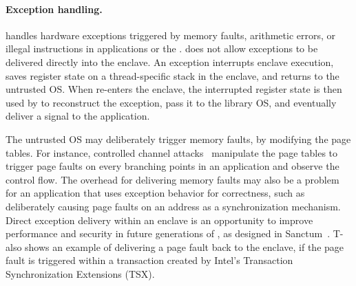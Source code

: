 \paragraph{Exception handling.}
\graphenesgx{} handles hardware exceptions triggered by memory faults, arithmetic errors, or illegal instructions in applications or the \libos{}.
\sgx{} does not allow exceptions to be delivered directly into the enclave.
An exception interrupts enclave execution, 
saves register state on a thread-specific stack in the enclave,
and returns to the untrusted OS.
When \sgx{} re-enters the enclave, the interrupted register state
is then used by
\graphenesgx{} to reconstruct the exception, pass it to the library OS, and eventually deliver a signal to the application.



The untrusted OS may deliberately trigger memory faults, %
by modifying the page tables.
For instance, controlled channel attacks~\cite{xu15controlledchannel}
manipulate the page tables to trigger page faults on every branching points in an \sgx{} application
and observe the control flow.
The overhead for delivering memory faults
may also be a problem
for an application that uses exception behavior for correctness, such as deliberately causing page faults on an address as a synchronization mechanism.
Direct exception delivery within an enclave %
is an opportunity to improve performance and security in future generations of \sgx{},
as designed in Sanctum~\cite{costan2016sanctum}.
T-\sgx{}~\cite{shih2017t-sgx}
also shows an example of delivering a page fault back to the enclave, if the page fault
is triggered within a transaction created by Intel's Transaction Synchronization Extensions (TSX).



